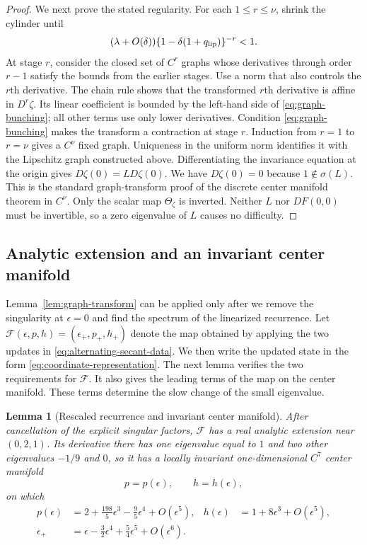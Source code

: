 \documentclass[11pt]{article}
\newtheorem{lemma}[theorem]{Lemma}
\begin{document}
\begin{proof}
We next prove the stated regularity.  For each
$1\le r\le\nu$, shrink the cylinder until
\begin{equation}\label{eq:graph-bunching}
(\lambda+O(\delta))
\{1-\delta(1+q_{\rm lip})\}^{-r}<1.
\end{equation}
At stage $r$, consider the closed set of $C^r$ graphs whose derivatives through
order $r-1$ satisfy the bounds from the earlier stages.  Use a norm that also
controls the $r$th derivative.  The chain rule shows that the transformed
$r$th derivative is affine in $D^r\zeta$.  Its linear coefficient is bounded
by the left-hand side of \eqref{eq:graph-bunching}; all other terms use only
lower derivatives.  Condition \eqref{eq:graph-bunching} makes the transform a
contraction at stage $r$.  Induction from $r=1$ to $r=\nu$ gives a $C^\nu$
fixed graph.  Uniqueness in the uniform norm identifies it with the Lipschitz
graph constructed above.  Differentiating the invariance equation at the
origin gives $D\zeta(0)=L D\zeta(0)$.  We have $D\zeta(0)=0$ because
$1\notin\sigma(L)$.  This is the standard graph-transform proof of the
discrete center manifold theorem in $C^\nu$.  Only the scalar map
$\Theta_\zeta$ is inverted.  Neither $L$ nor $DF(0,0)$ must be invertible, so
a zero eigenvalue of $L$ causes no difficulty.
\end{proof}

\subsection{Analytic extension and an invariant center manifold}

Lemma~\ref{lem:graph-transform} can be applied only after we remove the
singularity at $\epsilon=0$ and find the spectrum of the linearized recurrence.
Let
$\mathcal F(\epsilon,p,h)=(\epsilon_+,p_+,h_+)$ denote the map obtained by
applying the two updates in \eqref{eq:alternating-secant-data}.  We then write
the updated state in the form \eqref{eq:coordinate-representation}.  The next
lemma verifies the two requirements for $\mathcal F$.  It also gives the
leading terms of the map on the center manifold.  These terms determine the
slow change of the small eigenvalue.

\begin{lemma}[Rescaled recurrence and invariant center manifold]
\label{lem:center-manifold}
After cancellation of the explicit singular factors, $\mathcal F$ has a real
analytic extension near $(0,2,1)$.  Its derivative there has one eigenvalue
equal to $1$ and two other eigenvalues
$-1/9$ and $0$, so it has a
locally invariant one-dimensional $C^7$ center manifold
\[
p=p(\epsilon),\qquad h=h(\epsilon),
\]
on which
\begin{align}
p(\epsilon)&=2+\frac{198}{5}\epsilon^3
-\frac95\epsilon^4+O(\epsilon^5),
&h(\epsilon)&=1+8\epsilon^3+O(\epsilon^5),
\label{eq:center-curve}\\
\epsilon_+&=\epsilon-\frac32\epsilon^4
+\frac54\epsilon^5+O(\epsilon^6).
\label{eq:epsilon-map}
\end{align}
\end{lemma}
\end{document}
